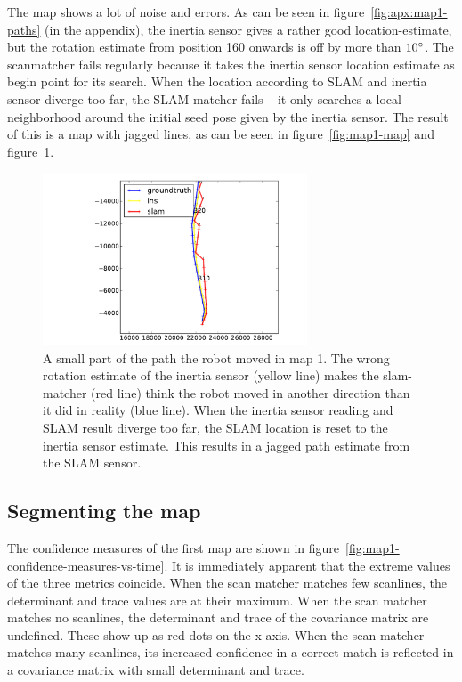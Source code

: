The map shows a lot of noise and errors. As can be seen in figure~\ref{fig:apx:map1-paths} (in the appendix), the inertia sensor gives a rather good location-estimate, but the rotation estimate from position 160 onwards is off by more than $10\degree$. The scanmatcher fails regularly because it takes the inertia sensor location estimate as begin point for its search. When the location according to SLAM and inertia sensor diverge too far, the SLAM matcher fails -- it only searches a local neighborhood around the initial seed pose given by the inertia sensor. The result of this is a map with jagged lines, as can be seen in figure~\ref{fig:map1-map} and figure~\ref{fig:map1-ins-problem}.

\begin{figure}[ht]
  \centering
  \includegraphics[width=0.7\textwidth]{images/experiment/map1/ins-problem.pdf}
  \caption{A small part of the path the robot moved in map 1. The wrong rotation estimate of the inertia sensor (yellow line) makes the slam-matcher (red line) think the robot moved in another direction than it did in reality (blue line). When the inertia sensor reading and SLAM result diverge too far, the SLAM location is reset to the inertia sensor estimate. This results in a jagged path estimate from the SLAM sensor.}
  \label{fig:map1-ins-problem}
\end{figure}


\subsection{Segmenting the map}
The confidence measures of the first map are shown in figure~\ref{fig:map1-confidence-measures-vs-time}. It is immediately apparent that the extreme values of the three metrics coincide. When the scan matcher matches few scanlines, the determinant and trace values are at their maximum. When the scan matcher matches no scanlines, the determinant and trace of the covariance matrix are undefined. These show up as red dots on the x-axis. When the scan matcher matches many scanlines, its increased confidence in a correct match is reflected in a covariance matrix with small determinant and trace.

